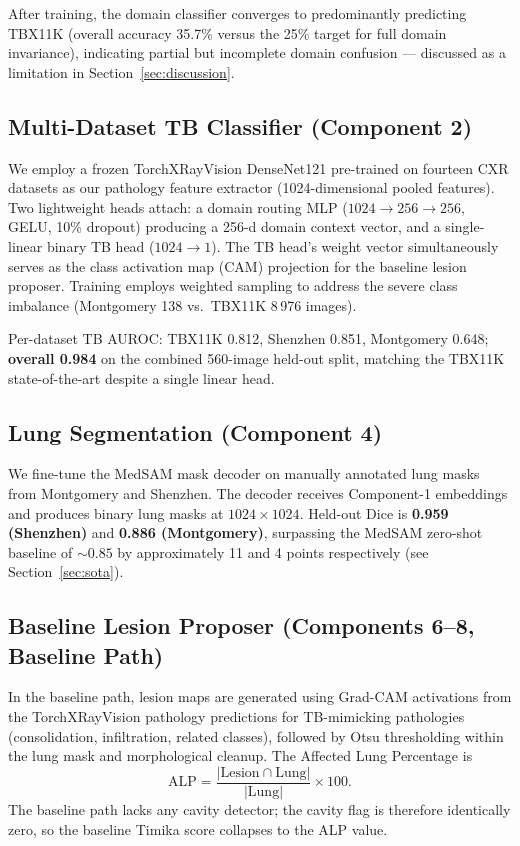 \documentclass{article}
\begin{document}
After training, the domain classifier converges to predominantly predicting TBX11K (overall accuracy 35.7\% versus the 25\% target for full domain invariance), indicating partial but incomplete domain confusion --- discussed as a limitation in Section~\ref{sec:discussion}.

\subsection{Multi-Dataset TB Classifier (Component 2)}

We employ a frozen TorchXRayVision DenseNet121 \cite{cohen2022torchxrayvision, huang2017densenet} pre-trained on fourteen CXR datasets as our pathology feature extractor (1024-dimensional pooled features). Two lightweight heads attach: a domain routing MLP ($1024{\rightarrow}256{\rightarrow}256$, GELU, 10\% dropout) producing a 256-d domain context vector, and a single-linear binary TB head ($1024{\rightarrow}1$). The TB head's weight vector simultaneously serves as the class activation map (CAM) projection for the baseline lesion proposer. Training employs weighted sampling to address the severe class imbalance (Montgomery 138 vs.\ TBX11K 8\,976 images).

Per-dataset TB AUROC: TBX11K 0.812, Shenzhen 0.851, Montgomery 0.648; \textbf{overall 0.984} on the combined 560-image held-out split, matching the TBX11K state-of-the-art despite a single linear head.

\subsection{Lung Segmentation (Component 4)}

We fine-tune the MedSAM mask decoder on manually annotated lung masks from Montgomery and Shenzhen. The decoder receives Component-1 embeddings and produces binary lung masks at $1024{\times}1024$. Held-out Dice is \textbf{0.959 (Shenzhen)} and \textbf{0.886 (Montgomery)}, surpassing the MedSAM zero-shot baseline of $\sim 0.85$ by approximately 11 and 4 points respectively (see Section~\ref{sec:sota}).

\subsection{Baseline Lesion Proposer (Components 6--8, Baseline Path)}

In the baseline path, lesion maps are generated using Grad-CAM \cite{selvaraju2017gradcam} activations from the TorchXRayVision pathology predictions for TB-mimicking pathologies (consolidation, infiltration, related classes), followed by Otsu thresholding \cite{otsu1979threshold} within the lung mask and morphological cleanup. The Affected Lung Percentage is
\begin{equation}
\text{ALP} = \frac{|\text{Lesion} \cap \text{Lung}|}{|\text{Lung}|} \times 100.
\label{eq:alp}
\end{equation}
The baseline path lacks any cavity detector; the cavity flag is therefore identically zero, so the baseline Timika score collapses to the ALP value.
\end{document}
